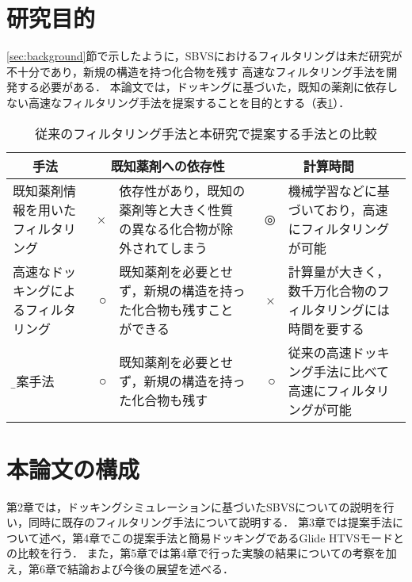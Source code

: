 \section{研究目的}
\ref{sec:background}節で示したように，SBVSにおけるフィルタリングは未だ研究が不十分であり，新規の構造を持つ化合物を残す
高速なフィルタリング手法を開発する必要がある．
本論文では，ドッキングに基づいた，既知の薬剤に依存しない高速なフィルタリング手法を提案することを目的とする（表\ref{table:filtering_aim}）．

\begin{table}[t] \centering
	\caption{従来のフィルタリング手法と本研究で提案する手法との比較}
	\label{table:filtering_aim}
	\begin{tabular}{p{3.5cm}|rp{5cm}|rp{5cm}}
	\hline
	\multicolumn{1}{c|}{手法}&\multicolumn{2}{c|}{既知薬剤への依存性}&\multicolumn{2}{c}{計算時間} \\
	\hline
	既知薬剤情報を用いたフィルタリング&\ {\large ×}&依存性があり，既知の薬剤等と大きく性質の異なる化合物が除外されてしまう&\ {\large ◎}&機械学習などに基づいており，高速にフィルタリングが可能 \\
	\hline
	高速なドッキングによるフィルタリング&\ {\large ○}&既知薬剤を必要とせず，新規の構造を持った化合物も残すことができる&\ {\large ×}&計算量が大きく，数千万化合物のフィルタリングには時間を要する \\
	\hline
	\b{\large 提案手法}&\ {\large ○}&既知薬剤を必要とせず，新規の構造を持った化合物も残す&\ {\large ○}&従来の高速ドッキング手法に比べて高速にフィルタリングが可能 \\
	\hline
	\end{tabular}	
\end{table}

\section{本論文の構成}
第2章では，ドッキングシミュレーションに基づいたSBVSについての説明を行い，同時に既存のフィルタリング手法について説明する．
第3章では提案手法について述べ，第4章でこの提案手法と簡易ドッキングであるGlide HTVSモードとの比較を行う．
また，第5章では第4章で行った実験の結果についての考察を加え，第6章で結論および今後の展望を述べる．